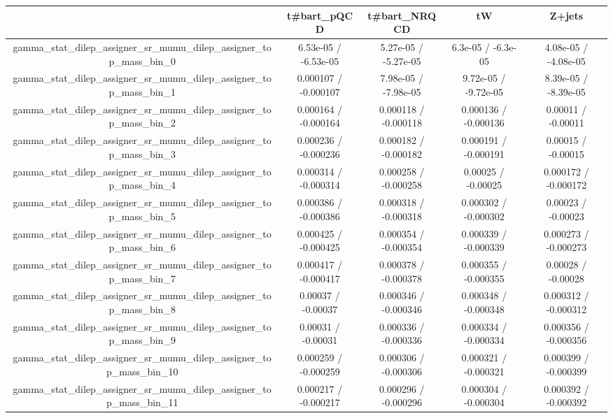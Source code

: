 \documentclass[10pt]{article}
\begin{document}
\begin{table}[htbp]
\begin{center}
\begin{tabular}{|c|c|c|c|c|}
\hline 
      & t#bar{t}_{pQCD}      & t#bar{t}_{NRQCD}      & tW      & Z+jets \\ 
\hline 
  gamma_stat_dilep_assigner_sr_mumu_dilep_assigner_top_mass_bin_0 & 6.53e-05 / -6.53e-05 & 5.27e-05 / -5.27e-05 & 6.3e-05 / -6.3e-05 & 4.08e-05 / -4.08e-05 \\ 
  gamma_stat_dilep_assigner_sr_mumu_dilep_assigner_top_mass_bin_1 & 0.000107 / -0.000107 & 7.98e-05 / -7.98e-05 & 9.72e-05 / -9.72e-05 & 8.39e-05 / -8.39e-05 \\ 
  gamma_stat_dilep_assigner_sr_mumu_dilep_assigner_top_mass_bin_2 & 0.000164 / -0.000164 & 0.000118 / -0.000118 & 0.000136 / -0.000136 & 0.00011 / -0.00011 \\ 
  gamma_stat_dilep_assigner_sr_mumu_dilep_assigner_top_mass_bin_3 & 0.000236 / -0.000236 & 0.000182 / -0.000182 & 0.000191 / -0.000191 & 0.00015 / -0.00015 \\ 
  gamma_stat_dilep_assigner_sr_mumu_dilep_assigner_top_mass_bin_4 & 0.000314 / -0.000314 & 0.000258 / -0.000258 & 0.00025 / -0.00025 & 0.000172 / -0.000172 \\ 
  gamma_stat_dilep_assigner_sr_mumu_dilep_assigner_top_mass_bin_5 & 0.000386 / -0.000386 & 0.000318 / -0.000318 & 0.000302 / -0.000302 & 0.00023 / -0.00023 \\ 
  gamma_stat_dilep_assigner_sr_mumu_dilep_assigner_top_mass_bin_6 & 0.000425 / -0.000425 & 0.000354 / -0.000354 & 0.000339 / -0.000339 & 0.000273 / -0.000273 \\ 
  gamma_stat_dilep_assigner_sr_mumu_dilep_assigner_top_mass_bin_7 & 0.000417 / -0.000417 & 0.000378 / -0.000378 & 0.000355 / -0.000355 & 0.00028 / -0.00028 \\ 
  gamma_stat_dilep_assigner_sr_mumu_dilep_assigner_top_mass_bin_8 & 0.00037 / -0.00037 & 0.000346 / -0.000346 & 0.000348 / -0.000348 & 0.000312 / -0.000312 \\ 
  gamma_stat_dilep_assigner_sr_mumu_dilep_assigner_top_mass_bin_9 & 0.00031 / -0.00031 & 0.000336 / -0.000336 & 0.000334 / -0.000334 & 0.000356 / -0.000356 \\ 
  gamma_stat_dilep_assigner_sr_mumu_dilep_assigner_top_mass_bin_10 & 0.000259 / -0.000259 & 0.000306 / -0.000306 & 0.000321 / -0.000321 & 0.000399 / -0.000399 \\ 
  gamma_stat_dilep_assigner_sr_mumu_dilep_assigner_top_mass_bin_11 & 0.000217 / -0.000217 & 0.000296 / -0.000296 & 0.000304 / -0.000304 & 0.000392 / -0.000392 \\ 

\end{tabular}
\end{center}
\end{table}
\end{document}

